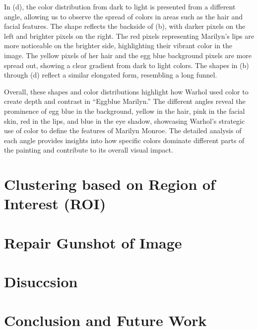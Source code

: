 \documentclass{article}
\begin{document}
In (d), the color distribution from dark to light is presented from a
different angle, allowing us to observe the spread of colors in areas
such as the hair and facial features. The shape reflects the backside of
(b), with darker pixels on the left and brighter pixels on the right.
The red pixels representing Marilyn's lips are more noticeable on the
brighter side, highlighting their vibrant color in the image. The yellow
pixels of her hair and the egg blue background pixels are more spread
out, showing a clear gradient from dark to light colors. The shapes in
(b) through (d) reflect a similar elongated form, resembling a long
funnel.

Overall, these shapes and color distributions highlight how Warhol used
color to create depth and contrast in ``Eggblue Marilyn.'' The different
angles reveal the prominence of egg blue in the background, yellow in
the hair, pink in the facial skin, red in the lips, and blue in the eye
shadow, showcasing Warhol's strategic use of color to define the
features of Marilyn Monroe. The detailed analysis of each angle provides
insights into how specific colors dominate different parts of the
painting and contribute to its overall visual impact.

\hypertarget{clustering-based-on-region-of-interest-roi}{%
\section{Clustering based on Region of Interest
(ROI)}\label{clustering-based-on-region-of-interest-roi}}

\hypertarget{repair-gunshot-of-image}{%
\section{Repair Gunshot of Image}\label{repair-gunshot-of-image}}

\hypertarget{disuccsion}{%
\section{Disuccsion}\label{disuccsion}}

\hypertarget{conclusion-and-future-work}{%
\section*{Conclusion and Future Work}\label{conclusion-and-future-work}}
\end{document}

